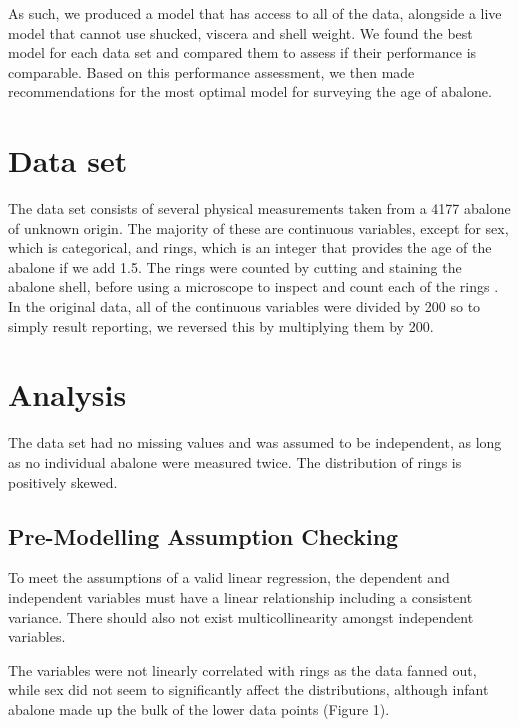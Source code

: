 \documentclass[a4paper,9pt,twocolumn,twoside,]{pinp}
\begin{document}
As such, we produced a model that has access to all of the data,
alongside a live model that cannot use shucked, viscera and shell
weight. We found the best model for each data set and compared them to
assess if their performance is comparable. Based on this performance
assessment, we then made recommendations for the most optimal model for
surveying the age of abalone.

\hypertarget{data-set}{%
\section{Data set}\label{data-set}}

The data set consists of several physical measurements taken from a 4177
abalone of unknown origin. The majority of these are continuous
variables, except for sex, which is categorical, and rings, which is an
integer that provides the age of the abalone if we add 1.5. The rings
were counted by cutting and staining the abalone shell, before using a
microscope to inspect and count each of the rings \citep{abalone}. In
the original data, all of the continuous variables were divided by 200
so to simply result reporting, we reversed this by multiplying them by
200.

\hypertarget{analysis}{%
\section{Analysis}\label{analysis}}

The data set had no missing values and was assumed to be independent, as
long as no individual abalone were measured twice. The distribution of
rings is positively skewed.

\hypertarget{pre-modelling-assumption-checking}{%
\subsection{Pre-Modelling Assumption
Checking}\label{pre-modelling-assumption-checking}}

To meet the assumptions of a valid linear regression, the dependent and
independent variables must have a linear relationship including a
consistent variance. There should also not exist multicollinearity
amongst independent variables.

The variables were not linearly correlated with rings as the data fanned
out, while sex did not seem to significantly affect the distributions,
although infant abalone made up the bulk of the lower data points
(Figure 1).
\end{document}
